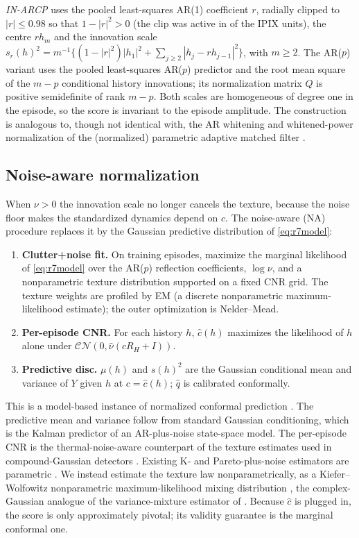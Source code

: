 \documentclass[journal]{IEEEtran}
\begin{document}
\emph{IN-ARCP} uses the pooled least-squares AR(1) coefficient $r$, radially clipped to $|r|\le0.98$ so that $1-|r|^2>0$ (the clip was active in \FitClampBinding{} of the \NUnitsConf{} IPIX units), the centre $rh_m$ and the innovation scale $s_r(h)^2=m^{-1}\{(1-|r|^2)|h_1|^2+\sum_{j\ge2}|h_j-rh_{j-1}|^2\}$, with $m\ge2$. The AR($p$) variant uses the pooled least-squares AR($p$) predictor and the root mean square of the $m-p$ conditional history innovations; its normalization matrix $Q$ is positive semidefinite of rank $m-p$. Both scales are homogeneous of degree one in the episode, so the score is invariant to the episode amplitude. The construction is analogous to, though not identical with, the AR whitening and whitened-power normalization of the (normalized) parametric adaptive matched filter \cite{roman2000,michels2000}.

\subsection{Noise-aware normalization}
When $\nu>0$ the innovation scale no longer cancels the texture, because the noise floor makes the standardized dynamics depend on $c$. The noise-aware (NA) procedure replaces it by the Gaussian predictive distribution of \eqref{eq:r7model}:
\begin{enumerate}[leftmargin=*,itemsep=2pt]
\item \textbf{Clutter+noise fit.} On training episodes, maximize the marginal likelihood of \eqref{eq:r7model} over the AR($p$) reflection coefficients, $\log\nu$, and a nonparametric texture distribution supported on a fixed CNR grid. The texture weights are profiled by EM (a discrete nonparametric maximum-likelihood estimate); the outer optimization is Nelder--Mead.
\item \textbf{Per-episode CNR.} For each history $h$, $\widehat c(h)$ maximizes the likelihood of $h$ alone under $\mathcal{CN}(0,\widehat\nu(cR_H+I))$.
\item \textbf{Predictive disc.} $\mu(h)$ and $s(h)^2$ are the Gaussian conditional mean and variance of $Y$ given $h$ at $c=\widehat c(h)$; $\widehat q$ is calibrated conformally.
\end{enumerate}
This is a model-based instance of normalized conformal prediction \cite{dewolf2025}. The predictive mean and variance follow from standard Gaussian conditioning, which is the Kalman predictor of an AR-plus-noise state-space model. The per-episode CNR is the thermal-noise-aware counterpart of the texture estimates used in compound-Gaussian detectors \cite{greco2001,gini2002}. Existing K- and Pareto-plus-noise estimators are parametric \cite{watts1987,bocquet2015,mezache2016}. We instead estimate the texture law nonparametrically, as a Kiefer--Wolfowitz nonparametric maximum-likelihood mixing distribution \cite{kiefer1956,laird1978,koenker2014}, the complex-Gaussian analogue of the variance-mixture estimator of \cite{ignatiadis2025}. Because $\widehat c$ is plugged in, the score is only approximately pivotal; its validity guarantee is the marginal conformal one.
\end{document}
